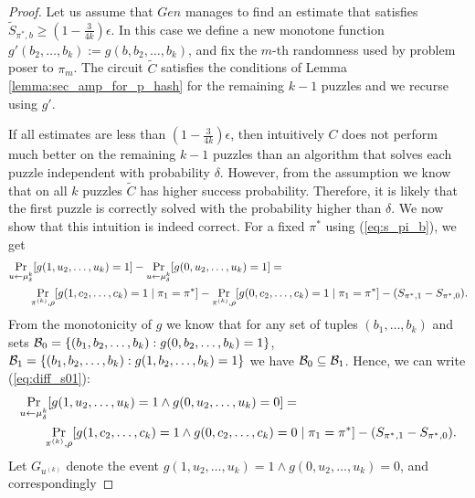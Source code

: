 \begin{proof}
Let us assume that $Gen$ manages to find an estimate that satisfies $\widetilde{S}_{\pi^*,b} \geq (1-\frac{3}{4k})\epsilon$.
In this case we define a new monotone function $g'(b_2, \dots, b_k) := g(b, b_2, \dots, b_k)$,
and fix the $m$-th randomness used by problem poser to $\pi_m$.
The circuit $\widetilde{C}$ satisfies the conditions of Lemma \ref{lemma:sec_amp_for_p_hash} for the remaining $k-1$ puzzles and we recurse using $g'$.

If all estimates are less than $(1-\frac{3}{4k})\epsilon$, then intuitively $C$
does not perform much better on the remaining $k-1$ puzzles than an algorithm that solves each puzzle independent with probability $\delta$.
However, from the assumption we know that on all $k$ puzzles $\widetilde{C}$ has higher success probability.
Therefore, it is likely that the first puzzle is correctly solved with the probability higher than $\delta$.
%
We now show that this intuition is indeed correct. For a fixed $\pi^*$ using (\ref{eq:s_pi_b}), we get
\begin{align}
\label{eq:diff_s01}
  &\underset{u \leftarrow \mu_{\delta}^k}{\Pr}[g(1, u_2, \dots, u_k)=1] - \underset{u \leftarrow \mu_{\delta}^k}{\Pr}[g(0, u_2, \dots, u_k)=1] = \notag\\
&\mbox\qquad  \underset{\pi^{(k)}, \rho}{\Pr}[g(1, c_2, \dots, c_k) =1 \mid \pi_1 = \pi^*] - \underset{\pi^{(k)}, \rho}{\Pr}[g(0, c_2, \dots, c_k) = 1 \mid \pi_1 = \pi^*] - (S_{\pi^*,1} - S_{\pi^*,0}).
\end{align}
From the monotonicity of $g$ we know that for any set of tuples $(b_1, \dots, b_k)$
and sets $\mathcal{B}_0 = \{ (b_1, b_2, \dots, b_k): g(0, b_2, \dots, b_k) = 1\}$, $ \mathcal{B}_1 = \{(b_1, b_2, \dots, b_k) : g(1, b_2, \dots, b_k) = 1 \}$
we have $\mathcal{B}_0 \subseteq \mathcal{B}_1$. Hence, we can write (\ref{eq:diff_s01}):
\begin{align}
  \label{eq:diff_s01_next}
  &\underset{u \leftarrow \mu_{\delta}^k}{\Pr}[g(1, u_2, \dots, u_k) = 1 \land g(0, u_2, \dots, u_k) = 0] = \notag\\
&\mbox\qquad  \underset{\pi^{(k)}, \rho}{\Pr}[g(1, c_2, \dots, c_k) = 1 \land g(0, c_2, \dots, c_k) = 0 \mid \pi_1 = \pi^*] - (S_{\pi^*,1} - S_{\pi^*,0}).
\end{align}
Let $G_{u^{(k)}}$ denote the event $g(1, u_2, \dots, u_k) = 1 \land g(0, u_2, \dots, u_k) = 0$, and correspondingly

\end{proof}
